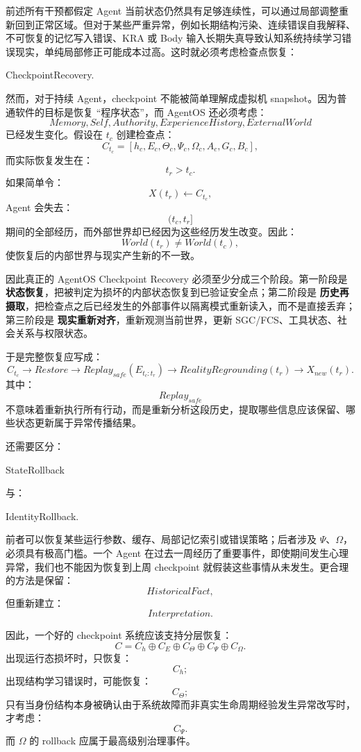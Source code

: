 前述所有干预都假定 Agent 当前状态仍然具有足够连续性，可以通过局部调整重新回到正常区域。但对于某些严重异常，例如长期结构污染、连续错误自我解释、不可恢复的记忆写入错误、KRA 或 Body 输入长期失真导致认知系统持续学习错误现实，单纯局部修正可能成本过高。这时就必须考虑检查点恢复：
\begin{statementbox}
CheckpointRecovery.
\end{statementbox}

然而，对于持续 Agent，checkpoint 不能被简单理解成虚拟机 snapshot。因为普通软件的目标是恢复 ``程序状态''，而 AgentOS 还必须考虑：
\[
Memory,
Self,
Authority,
ExperienceHistory,
ExternalWorld
\]
已经发生变化。假设在 $t_c$ 创建检查点：
\[
C_{t_c}
=
[
h_c,
E_c,
\Theta_c,
\Psi_c,
\Omega_c,
A_c,
G_c,
B_c
],
\]
而实际恢复发生在：
\[
t_r>t_c.
\]
如果简单令：
\[
X(t_r)
\leftarrow
C_{t_c},
\]
Agent 会失去：
\[
(t_c,t_r]
\]
期间的全部经历，而外部世界却已经因为这些经历发生改变。因此：
\[
World(t_r)
\neq
World(t_c),
\]
使恢复后的内部世界与现实产生新的不一致。

因此真正的 AgentOS Checkpoint Recovery 必须至少分成三个阶段。第一阶段是 \textbf{状态恢复}，把被判定为损坏的内部状态恢复到已验证安全点；第二阶段是 \textbf{历史再摄取}，把检查点之后已经发生的外部事件以隔离模式重新读入，而不是直接丢弃；第三阶段是 \textbf{现实重新对齐}，重新观测当前世界，更新 SGC/FCS、工具状态、社会关系与权限状态。

于是完整恢复应写成：
\[
C_{t_c}
\rightarrow
Restore
\rightarrow
Replay_{safe}(E_{t_c:t_r})
\rightarrow
RealityRegrounding(t_r)
\rightarrow
X_{new}(t_r).
\]
其中：
\[
Replay_{safe}
\]
不意味着重新执行所有行动，而是重新分析这段历史，提取哪些信息应该保留、哪些状态更新属于异常传播结果。

还需要区分：
\begin{statementbox}
StateRollback
\end{statementbox}
与：
\begin{statementbox}
IdentityRollback.
\end{statementbox}
前者可以恢复某些运行参数、缓存、局部记忆索引或错误策略；后者涉及 $\Psi$、$\Omega$，必须具有极高门槛。一个 Agent 在过去一周经历了重要事件，即使期间发生心理异常，我们也不能因为恢复到上周 checkpoint 就假装这些事情从未发生。更合理的方法是保留：
\[
HistoricalFact,
\]
但重新建立：
\[
Interpretation.
\]

因此，一个好的 checkpoint 系统应该支持分层恢复：
\[
C
=
C_h
\oplus
C_E
\oplus
C_\Theta
\oplus
C_\Psi
\oplus
C_\Omega.
\]
出现运行态损坏时，只恢复：
\[
C_h;
\]
出现结构学习错误时，可能恢复：
\[
C_\Theta;
\]
只有当身份结构本身被确认由于系统故障而非真实生命周期经验发生异常改写时，才考虑：
\[
C_\Psi.
\]
而 $\Omega$ 的 rollback 应属于最高级别治理事件。

